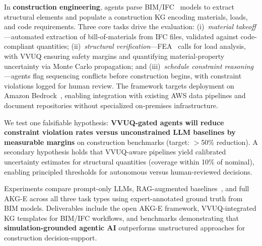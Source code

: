\documentclass[conference, 10pt]{IEEEtran}
\begin{document}
In \textbf{construction engineering}, agents parse BIM/IFC~\cite{Eastman2011BIM} models to extract structural elements and populate a construction KG encoding materials, loads, and code requirements. Three core tasks drive the evaluation: (i)~\textit{material takeoff}---automated extraction of bill-of-materials from IFC files, validated against code-compliant quantities; (ii)~\textit{structural verification}---FEA~\cite{Logg2012FEniCS} calls for load analysis, with VVUQ ensuring safety margins and quantifying material-property uncertainty via Monte Carlo propagation; and (iii)~\textit{schedule constraint reasoning}---agents flag sequencing conflicts before construction begins, with constraint violations logged for human review. The framework targets deployment on Amazon Bedrock~\cite{AWSBedrockHybridSearch2024}, enabling integration with existing AWS data pipelines and document repositories without specialized on-premises infrastructure.

We test one falsifiable hypothesis: \textbf{VVUQ-gated agents will reduce constraint violation rates versus unconstrained LLM baselines by measurable margins} on construction benchmarks (target: $>$50\% reduction). A secondary hypothesis holds that VVUQ-aware pipelines yield calibrated uncertainty estimates for structural quantities (coverage within 10\% of nominal), enabling principled thresholds for autonomous versus human-reviewed decisions.

Experiments compare prompt-only LLMs, RAG-augmented baselines~\cite{Lewis2020RAG}, and full AKG-E across all three task types using expert-annotated ground truth from BIM models. Deliverables include the open AKG-E framework, VVUQ-integrated KG templates for BIM/IFC workflows, and benchmarks demonstrating that \textbf{simulation-grounded agentic AI} outperforms unstructured approaches for construction decision-support.



\end{document}
